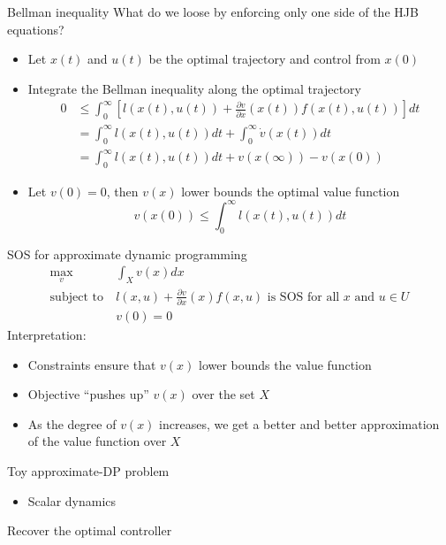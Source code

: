 \documentclass[aspectratio=169]{beamer}
\begin{document}
\begin{frame}{Bellman inequality}
What do we loose by enforcing only one side of the HJB equations?
\begin{itemize}
\item
Let $x(t)$ and $u(t)$ be the optimal trajectory and control from $x(0)$
\item
Integrate the Bellman inequality along the optimal trajectory
\begin{align*}
0 & \leq \int_0^\infty \left[ l(x(t), u(t)) + \frac{\partial v}{\partial x} (x(t)) f(x(t), u(t)) \right] dt \\
& = \int_0^\infty l(x(t), u(t)) dt + \int_0^\infty \dot v(x(t)) dt \\
& = \int_0^\infty l(x(t), u(t)) dt + v(x(\infty)) - v(x(0))
\end{align*}
\item
Let $v(0) = 0$, then $v(x)$ lower bounds the optimal value function
$$
v(x(0)) \leq \int_0^\infty l(x(t), u(t)) dt
$$
\end{itemize}
\end{frame}

\begin{frame}{SOS for approximate dynamic programming}
\begin{align*}
\max_v \ &\int_X v(x) dx \\
\text{subject to} \ & l(x, u) + \frac{\partial v}{\partial x} (x) f(x, u) \text{ is SOS for all } x \text{ and } u \in U \\
& v(0) = 0
\end{align*}
Interpretation:
\begin{itemize}
\item
Constraints ensure that $v(x)$ lower bounds the value function
\item
Objective ``pushes up'' $v(x)$ over the set $X$
\item
As the degree of $v(x)$ increases, we get a better and better approximation of the value function over $X$
\end{itemize}
\end{frame}

\begin{frame}{Toy approximate-DP problem}
\begin{itemize}
\item
Scalar dynamics
\end{itemize}
\end{frame}

\begin{frame}{Recover the optimal controller}

\end{frame}
\end{document}

